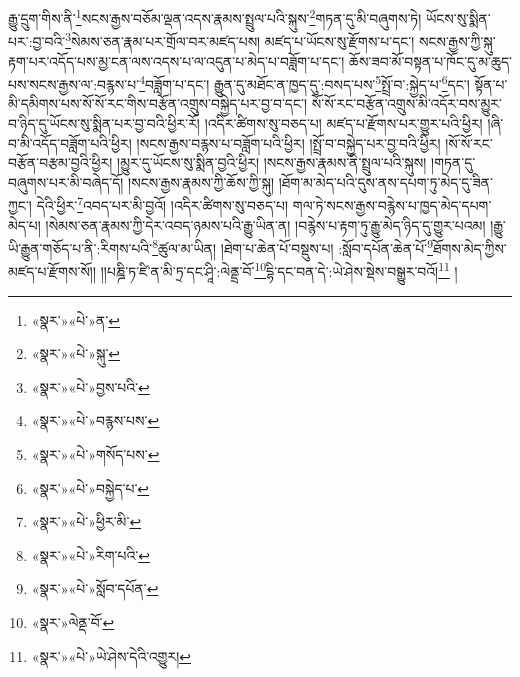 རྒྱུ་དྲུག་གིས་ནི་\footnote{«སྣར་»«པེ་»ན་}སངས་རྒྱས་བཅོམ་ལྡན་འདས་རྣམས་སྤྲུལ་པའི་སྐུས་\footnote{«སྣར་»«པེ་»སྐུ་}གཏན་དུ་མི་བཞུགས་ཏེ། ཡོངས་སུ་སྨིན་པར་:བྱ་བའི་\footnote{«སྣར་»«པེ་»བྱས་པའི་}སེམས་ཅན་རྣམ་པར་གྲོལ་བར་མཛད་པས། མཛད་པ་ཡོངས་སུ་རྫོགས་པ་དང་། སངས་རྒྱས་ཀྱི་སྐུ་རྟག་པར་འདོད་པས་མྱ་ངན་ལས་འདས་པ་ལ་འདུན་པ་མེད་པ་བཟློག་པ་དང་། ཆོས་ཟབ་མོ་བསྟན་པ་ཁོང་དུ་མ་ཆུད་པས་སངས་རྒྱས་ལ་:བརྙས་པ་\footnote{«སྣར་»«པེ་»བརྙས་པས་}བཟློག་པ་དང་། རྒྱུན་དུ་མཐོང་ན་ཁྱད་དུ་:བསད་པས་\footnote{«སྣར་»«པེ་»གསོད་པས་}སྤྲོ་བ་:སྐྱེད་པ་\footnote{«སྣར་»«པེ་»བསྐྱེད་པ་}དང་། སྟོན་པ་མི་དམིགས་པས་སོ་སོ་རང་གིས་བརྩོན་འགྲུས་བསྐྱེད་པར་བྱ་བ་དང་། སོ་སོ་རང་བརྩོན་འགྲུས་མི་འདོར་བས་མྱུར་བ་ཉིད་དུ་ཡོངས་སུ་སྨིན་པར་བྱ་བའི་ཕྱིར་རོ། །འདིར་ཚིགས་སུ་བཅད་པ། མཛད་པ་རྫོགས་པར་གྱུར་པའི་ཕྱིར། །ཞི་བ་མི་འདོད་བཟློག་པའི་ཕྱིར། །སངས་རྒྱས་བརྙས་པ་བཟློག་པའི་ཕྱིར། །སྤྲོ་བ་བསྐྱེད་པར་བྱ་བའི་ཕྱིར། །སོ་སོ་རང་བརྩོན་བརྩམ་བྱའི་ཕྱིར། །མྱུར་དུ་ཡོངས་སུ་སྨིན་བྱའི་ཕྱིར། །སངས་རྒྱས་རྣམས་ནི་སྤྲུལ་པའི་སྐུས། །གཏན་དུ་བཞུགས་པར་མི་བཞེད་དོ། །སངས་རྒྱས་རྣམས་ཀྱི་ཆོས་ཀྱི་སྐུ། །ཐོག་མ་མེད་པའི་དུས་ནས་དཔག་ཏུ་མེད་དུ་ཟིན་ཀྱང་། དེའི་ཕྱིར་\footnote{«སྣར་»«པེ་»ཕྱིར་མི་}འབད་པར་མི་བྱའོ། །འདིར་ཚིགས་སུ་བཅད་པ། གལ་ཏེ་སངས་རྒྱས་བརྙེས་པ་ཁྱད་མེད་དཔག་མེད་པ། །སེམས་ཅན་རྣམས་ཀྱི་དེར་འབད་ཉམས་པའི་རྒྱུ་ཡིན་ན། །བརྙེས་པ་རྟག་ཏུ་རྒྱུ་མེད་ཉིད་དུ་གྱུར་པའམ། །རྒྱུ་ཡི་རྒྱུན་གཅོད་པ་ནི་:རིགས་པའི་\footnote{«སྣར་»«པེ་»རིག་པའི་}ཚུལ་མ་ཡིན། །ཐེག་པ་ཆེན་པོ་བསྡུས་པ། :སློབ་དཔོན་ཆེན་པོ་\footnote{«སྣར་»«པེ་»སློབ་དཔོན་}ཐོགས་མེད་ཀྱིས་མཛད་པ་རྫོགས་སོ།། །།པཎྜི་ཏ་ཛི་ན་མི་ཏྲ་དང་ཤཱི་:ལེནྡྲ་བོ་\footnote{«སྣར་»ལེནྡ་བོ་}དྷི་དང་བན་དེ་:ཡེ་ཤེས་སྡེས་བསྒྱུར་བའོ།\footnote{«སྣར་»«པེ་»ཡེ་ཤེས་དེའི་འགྱུར།} །